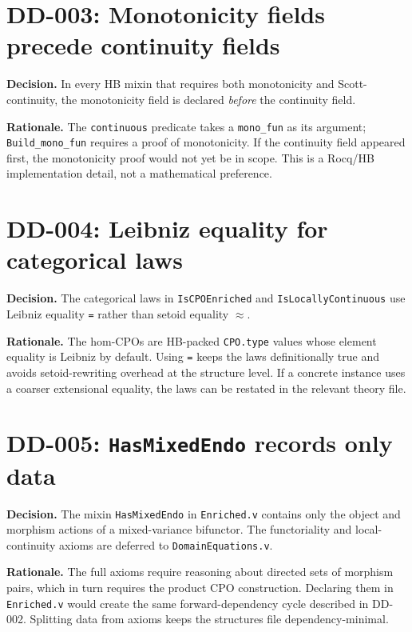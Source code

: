 \section*{DD-003: Monotonicity fields precede continuity fields}

\textbf{Decision.}
In every HB mixin that requires both monotonicity and Scott-continuity,
the monotonicity field is declared \emph{before} the continuity field.

\textbf{Rationale.}
The \texttt{continuous} predicate takes a \texttt{mono\_fun} as its
argument; \texttt{Build\_mono\_fun} requires a proof of monotonicity.
If the continuity field appeared first, the monotonicity proof would not
yet be in scope.  This is a Rocq/HB implementation detail, not a
mathematical preference.

\section*{DD-004: Leibniz equality for categorical laws}

\textbf{Decision.}
The categorical laws in \texttt{IsCPOEnriched} and
\texttt{IsLocallyContinuous} use Leibniz equality \texttt{=} rather than
setoid equality \texttt{$\approx$}.

\textbf{Rationale.}
The hom-CPOs are HB-packed \texttt{CPO.type} values whose element
equality is Leibniz by default.  Using \texttt{=} keeps the laws
definitionally true and avoids setoid-rewriting overhead at the structure
level.  If a concrete instance uses a coarser extensional equality, the
laws can be restated in the relevant theory file.

\section*{DD-005: \texttt{HasMixedEndo} records only data}

\textbf{Decision.}
The mixin \texttt{HasMixedEndo} in \texttt{Enriched.v} contains only the
object and morphism actions of a mixed-variance bifunctor.  The
functoriality and local-continuity axioms are deferred to
\texttt{DomainEquations.v}.

\textbf{Rationale.}
The full axioms require reasoning about directed sets of morphism pairs,
which in turn requires the product CPO construction.  Declaring them in
\texttt{Enriched.v} would create the same forward-dependency cycle
described in DD-002.  Splitting data from axioms keeps the structures
file dependency-minimal.

